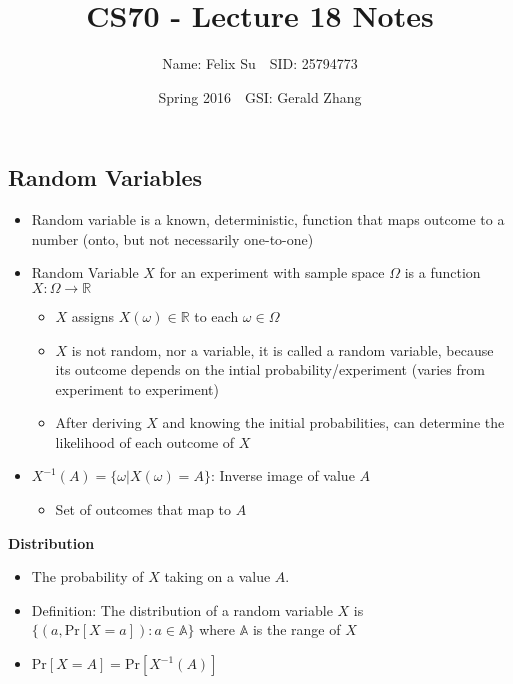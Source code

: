 \documentclass{article}\usepackage{amsmath,amssymb,amsthm,tikz,tkz-graph,color,chngpage,soul,hyperref,csquotes,graphicx,floatrow, listings}\newcommand*{\QEDB}{\hfill\ensuremath{\square}}\newtheorem*{prop}{Proposition}\renewcommand{\theenumi}{\alph{enumi}}\usepackage[shortlabels]{enumitem}\usepackage[nobreak=true]{mdframed}\usetikzlibrary{matrix,calc}\MakeOuterQuote{"}\usepackage[margin=0.75in]{geometry} \newtheorem{theorem}{Theorem}\newcommand{\Z}{\mathbb Z}\newcommand{\R}{\mathbb R}\newcommand{\Q}{\mathbb Q}\newcommand{\N}{\mathbb N}\newcommand{\x}[1]{\textrm{ #1 }}\newcommand{\pr}{\textrm{Pr}}
\title{CS70 - Lecture 18 Notes}
\author{Name: Felix Su$\quad$SID: 25794773}
\date{Spring 2016$\quad$GSI: Gerald Zhang}
\begin{document}
\maketitle

\subsection*{Random Variables}
\begin{itemize}
    \item Random variable is a known, deterministic, function that maps outcome to a number (onto, but not necessarily one-to-one)
    \item Random Variable $X$ for an experiment with sample space $\Omega$ is a function $X: \Omega \rightarrow \R$
    \begin{itemize}
        \item $X$ assigns $X(\omega) \in \R$ to each $\omega \in \Omega$
        \item $X$ is not random, nor a variable, it is called a random variable, because its outcome depends on the intial probability/experiment (varies from experiment to experiment)
        \item After deriving $X$ and knowing the initial probabilities, can determine the likelihood of each outcome of $X$
    \end{itemize}
    \item $X^{-1}(A)=\{\omega|X(\omega)=A\}$: Inverse image of value $A$
    \begin{itemize}
        \item Set of outcomes that map to $A$
    \end{itemize}
\end{itemize}
\textbf{Distribution}
\begin{itemize}
    \item The probability of $X$ taking on a value $A$.
    \item Definition: The distribution of a random variable $X$ is $\{(a,\pr[X=a]):a \in \mathbb{A}\}$ where $\mathbb{A}$ is the range of $X$
    \item $\pr[X=A]=\pr[X^{-1}(A)]$
\end{itemize}
\end{document}
